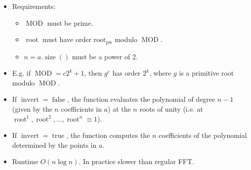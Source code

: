 \begin{itemize}
	\item Requirements:
	\begin{itemize}
		\item $\operatorname{MOD}$ must be prime.
		\item $\operatorname{root}$ must have order $\operatorname{root_{pw}}$ modulo $\operatorname{MOD}$.
		\item $n = a.\operatorname{size}()$ must be a power of 2.
	\end{itemize}
	\item E.g. if $\operatorname{MOD} = c2^k + 1$, then $g^c$ has order $2^k$, where $g$ is a primitive root modulo $\operatorname{MOD}$.
	\item If $\operatorname{invert} = \operatorname{false}$, the function evaluates the polynomial of degree $n - 1$ (given by the $n$ coefficients in $a$) at the $n$ roots of unity (i.e. at $\operatorname{root}^1, \operatorname{root}^2, \dots, \operatorname{root}^n \equiv 1$).
	\item If $\operatorname{invert} = \operatorname{true}$, the function computes the $n$ coefficients of the polynomial determined by the points in $a$.
	\item Runtime $O\left(n \log n\right)$. In practice slower than regular FFT.
\end{itemize}
